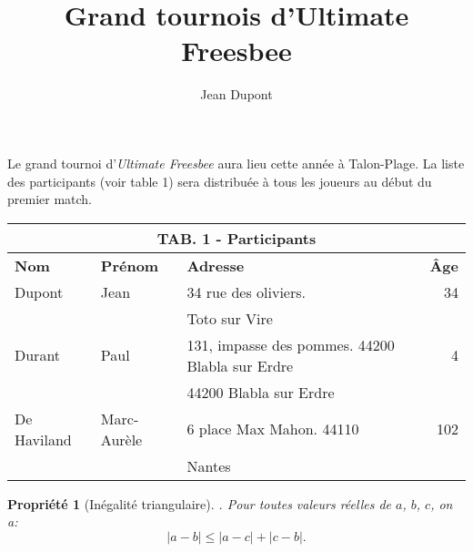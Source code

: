 \documentclass[a4paper]{article}
\title{Grand tournois d'Ultimate Freesbee}
\author{Jean Dupont}
\newtheorem{prop}{Propriété}
\newcommand{\vabs}[1]{\ensuremath{|#1|}}
\begin{document}
\maketitle
Le grand tournoi d'\textit{Ultimate Freesbee} aura lieu cette année à Talon-Plage. La liste des participants (voir table 1) sera distribuée à tous les joueurs au début du premier match.
	
\begin{tabular}{lllr}
	\multicolumn{4}{c}{TAB. 1 - Participants} \\
	\hline 
	\textbf{Nom} & \textbf{Prénom} & \textbf{Adresse} & \textbf{Âge} \\
	\hline 
	Dupont & Jean & 34 rue des oliviers. & 34 \\
	\multicolumn{2}{c}{} & Toto sur Vire & \\
	Durant & Paul & 131, impasse des pommes. 44200 Blabla sur Erdre & 4 \\
	\multicolumn{2}{c}{} & 44200 Blabla sur Erdre & \\
	De Haviland & Marc-Aurèle & 6 place Max Mahon. 44110 & 102 \\
	\multicolumn{2}{c}{} & Nantes & \\
	\hline
\end{tabular}

\begin{prop}[Inégalité triangulaire]. Pour toutes valeurs réelles de $a$, $b$, $c$, on a:
\begin{equation}
\vabs{a - b} \leqslant \vabs{a - c} + \vabs{c - b}. 
\end{equation}
\end{prop}
\end{document}
